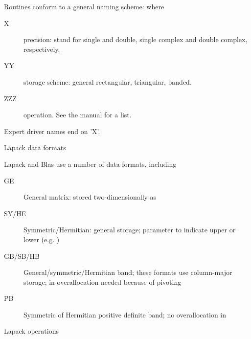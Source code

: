 Routines conform to a general naming scheme:  where
\begin{description}
\item[X] precision:  stand for single and double, single
  complex and double complex, respectively.
\item[YY] storage scheme: general rectangular, triangular, banded.
\item[ZZZ] operation. See the manual for a list.
\end{description}
Expert driver names end on 'X'.

 {Lapack data formats}

Lapack and Blas use a number of data formats, including
\begin{description}
\item[GE] General matrix: stored two-dimensionally as 
\item[SY/HE] Symmetric/Hermitian: general storage;  parameter
  to indicate upper or lower (e.g. )
\item[GB/SB/HB] General/symmetric/Hermitian band; these formats use
  column-major storage; in  overallocation needed because of
  pivoting
\item[PB] Symmetric of Hermitian positive definite band; no
  overallocation in 
\end{description}

 {Lapack operations}

